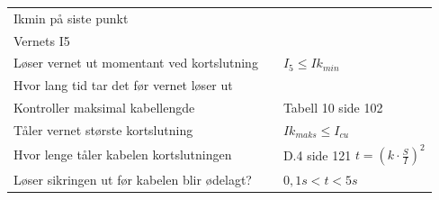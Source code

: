 \begin{center}
\begin{tabular}{| m{4cm} |m{4cm} |m{4cm} |}
Ikmin på siste punkt		& 				&								\\ \cline{1-3}
Vernets I5			& 				&								\\ \cline{1-3}
Løser vernet ut momentant ved kortslutning		& 	&$I_5\leq Ik_{min}$ 						\\ \cline{1-3}
Hvor lang tid tar det før vernet løser ut		& 	& 								\\ \cline{1-3}
Kontroller maksimal kabellengde 			&	&Tabell 10 side 102 						\\ \cline{1-3}
Tåler vernet største kortslutning 			& 	&$Ik_{maks} \leq I_{cu}$ 					\\ \cline{1-3}
Hvor lenge tåler kabelen kortslutningen  		& 	&D.4 side 121  $t=(k \cdot \frac{S}{I})^2$ 			\\ \cline{1-3}
Løser sikringen ut før kabelen blir ødelagt? 		& 	&$0,1s < t < 5s$ 						\\ \cline{1-3}


		
\end{tabular}
\end{center}



